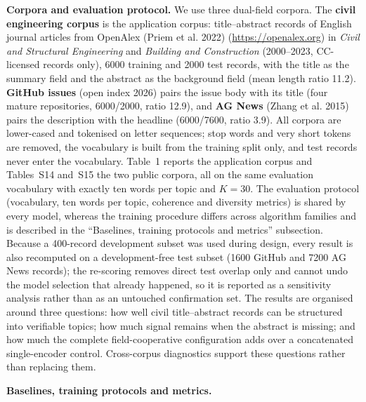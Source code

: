 \documentclass[Journal,letterpaper,NoLists]{ascelike-new}
\begin{document}
\noindent\textbf{Corpora and evaluation protocol.} We use three dual-field corpora. The \textbf{civil engineering corpus} is the application corpus:
title--abstract records of English journal articles from OpenAlex (Priem et al. 2022) (\url{https://openalex.org}) in \emph{Civil and Structural
Engineering} and \emph{Building and Construction} (2000--2023, CC-licensed records only), 6000
training and 2000 test records, with the title as the summary field and the abstract as the
background field (mean length ratio 11.2). \textbf{GitHub issues} (open index 2026) pairs the
issue body with its title (four mature repositories, 6000/2000, ratio 12.9), and \textbf{AG News}
(Zhang et al. 2015) pairs the description
with the headline (6000/7600, ratio 3.9). All corpora are lower-cased and tokenised on letter
sequences; stop words and very short tokens are removed, the vocabulary is built from the training
split only, and test records never enter the vocabulary. Table~1 reports the
application corpus and Tables~S14 and~S15 the two public corpora, all on
the same evaluation vocabulary with exactly ten words per topic and $K=30$. The evaluation
protocol (vocabulary, ten words per topic, coherence and
diversity metrics) is shared by every model, whereas the training procedure differs across
algorithm families and is described in the ``Baselines, training protocols and metrics'' subsection. Because a 400-record
development subset was used during design, every result is also
recomputed on a development-free test subset (1600 GitHub and 7200 AG News records); the
re-scoring removes direct test overlap only and cannot undo the model selection that already
happened, so it is reported as a sensitivity analysis rather than as an untouched confirmation
set. The results are organised around three questions: how well civil title--abstract records can
be structured into verifiable topics; how much signal remains when the abstract is missing; and
how much the complete field-cooperative configuration adds over a concatenated single-encoder
control. Cross-corpus diagnostics support these questions rather than replacing them.

\noindent\textbf{Baselines, training protocols and metrics.} \label{sec:protocol}
\end{document}
